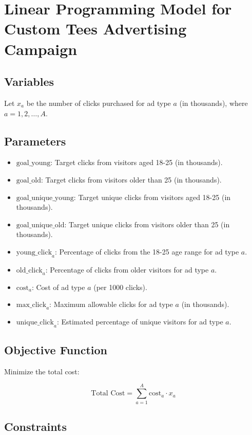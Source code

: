 \documentclass{article}
\begin{document}
\section*{Linear Programming Model for Custom Tees Advertising Campaign}

\subsection*{Variables}
Let \( x_a \) be the number of clicks purchased for ad type \( a \) (in thousands), where \( a = 1, 2, \ldots, A \).

\subsection*{Parameters}
\begin{itemize}
    \item \( \text{goal\_young} \): Target clicks from visitors aged 18-25 (in thousands).
    \item \( \text{goal\_old} \): Target clicks from visitors older than 25 (in thousands).
    \item \( \text{goal\_unique\_young} \): Target unique clicks from visitors aged 18-25 (in thousands).
    \item \( \text{goal\_unique\_old} \): Target unique clicks from visitors older than 25 (in thousands).
    \item \( \text{young\_click}_a \): Percentage of clicks from the 18-25 age range for ad type \( a \).
    \item \( \text{old\_click}_a \): Percentage of clicks from older visitors for ad type \( a \).
    \item \( \text{cost}_a \): Cost of ad type \( a \) (per 1000 clicks).
    \item \( \text{max\_click}_a \): Maximum allowable clicks for ad type \( a \) (in thousands).
    \item \( \text{unique\_click}_a \): Estimated percentage of unique visitors for ad type \( a \).
\end{itemize}

\subsection*{Objective Function}
Minimize the total cost:

\[
\text{Total Cost} = \sum_{a=1}^{A} \text{cost}_a \cdot x_a
\]

\subsection*{Constraints}
\end{document}
